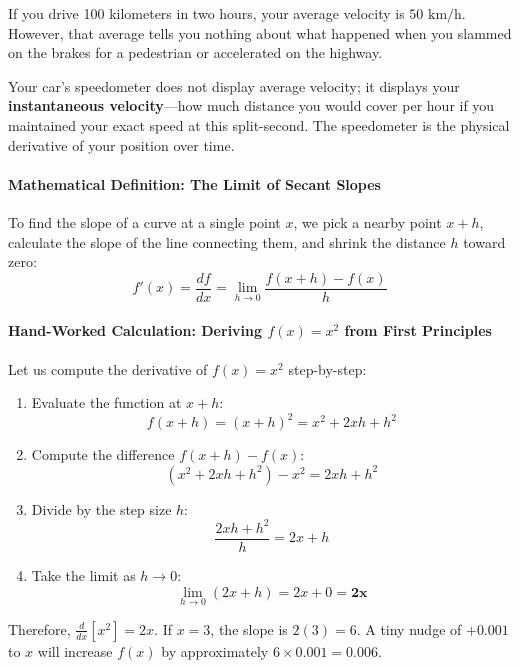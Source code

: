 \begin{analogy}
If you drive 100 kilometers in two hours, your average velocity is $50\text{ km/h}$. However, that average tells you nothing about what happened when you slammed on the brakes for a pedestrian or accelerated on the highway. 

Your car's speedometer does not display average velocity; it displays your \textbf{instantaneous velocity}---how much distance you would cover per hour if you maintained your exact speed at this split-second. The speedometer is the physical derivative of your position over time.
\end{analogy}

\paragraph{Mathematical Definition: The Limit of Secant Slopes}
To find the slope of a curve at a single point $x$, we pick a nearby point $x + h$, calculate the slope of the line connecting them, and shrink the distance $h$ toward zero:
\begin{equation}
f'(x) = \frac{df}{dx} = \lim_{h \to 0} \frac{f(x + h) - f(x)}{h}\label{eq:derivative_limit}
\end{equation}

\paragraph{Hand-Worked Calculation: Deriving $f(x) = x^2$ from First Principles}
Let us compute the derivative of $f(x) = x^2$ step-by-step:
\begin{enumerate}
    \item Evaluate the function at $x + h$:
    \begin{equation*}
    f(x + h) = (x + h)^2 = x^2 + 2xh + h^2
    \end{equation*}
    \item Compute the difference $f(x + h) - f(x)$:
    \begin{equation*}
    (x^2 + 2xh + h^2) - x^2 = 2xh + h^2
    \end{equation*}
    \item Divide by the step size $h$:
    \begin{equation*}
    \frac{2xh + h^2}{h} = 2x + h
    \end{equation*}
    \item Take the limit as $h \to 0$:
    \begin{equation*}
    \lim_{h \to 0} (2x + h) = 2x + 0 = \mathbf{2x}
    \end{equation*}
\end{enumerate}
Therefore, $\frac{d}{dx}[x^2] = 2x$. If $x = 3$, the slope is $2(3) = 6$. A tiny nudge of $+0.001$ to $x$ will increase $f(x)$ by approximately $6 \times 0.001 = 0.006$.

